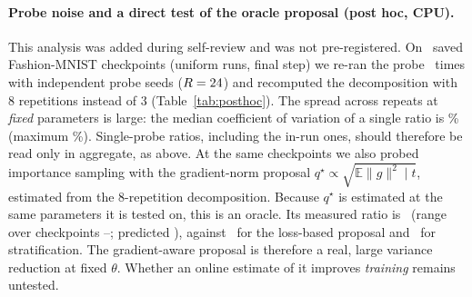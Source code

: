 \paragraph{Probe noise and a direct test of the oracle proposal (post hoc, CPU).}
\label{sec:probenoise}
This analysis was added during self-review and was not pre-registered. On \PHn\ saved Fashion-MNIST
checkpoints (uniform runs, final step) we re-ran the probe \PHrep\ times with independent probe seeds
($R=\PHR$) and recomputed the decomposition with 8 repetitions instead of 3 (Table~\ref{tab:posthoc}). The
spread across repeats at \emph{fixed} parameters is large: the median coefficient of variation of a single
ratio is \PHcv\% (maximum \PHcvmax\%). Single-probe ratios, including the in-run ones, should therefore be
read only in aggregate, as above. At the same checkpoints we also probed importance sampling with the
gradient-norm proposal $q^\star\propto\sqrt{\mathbb E\|g\|^2\mid t}$, estimated from the 8-repetition
decomposition. Because $q^\star$ is estimated at the same parameters it is tested on, this is an oracle. Its
measured ratio is \PHOracle\ (range over checkpoints \PHOraclemin--\PHOraclemax; predicted
\PHOraclePred), against \PHImp\ for the loss-based proposal and \PHStrat\ for stratification. The
gradient-aware proposal is therefore a real, large variance reduction at fixed $\theta$. Whether an online
estimate of it improves \emph{training} remains untested.

\begin{table}[t]
  \centering\small
  \caption{\textbf{Post-hoc re-probes at fixed parameters} (Fashion-MNIST, final checkpoints, CPU). Variance ratio
  vs.\ uniform: mean $\pm$ sd over \PHrep\ independent probe seeds ($R=\PHR$ each). Last column: prediction from
  the 8-repetition decomposition at the same checkpoint.}
  \label{tab:posthoc}
  
\end{table}

\begin{table}[t]
  \centering\small
  \caption{\textbf{Law-of-total-variance decomposition and the variance ratios it predicts} (Eq.~\ref{eq:anti}),
  compared with the direct measurement at the same checkpoint. The last column is the absolute per-sample
  variance of the uniform estimator ($N\cdot\mathrm{tr}\,\mathrm{Cov}$), predicted and measured.}
  \label{tab:decomp}
  \resizebox{\linewidth}{!}{}
\end{table}

\begin{table}[t]
  \centering\small
  \caption{\textbf{Training outcomes on CIFAR-10 at equal steps (3000) and equal evaluations per step.} Mean $\pm$ sd over
  seeds. $p$: two-sided Welch $t$-test against uniform (pre-registered). FID@1000/2000 are seed 0 only. The
   seed-2 run was trained without FID (PLAN A5), so its FID uses 2 seeds. ms/step excludes
  evaluation; T4 GPU, fp16.}
  \label{tab:main}
  \resizebox{\linewidth}{!}{}
\end{table}

